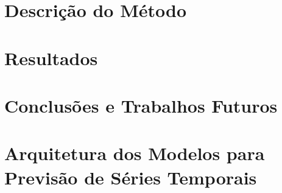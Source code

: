 \documentclass[a4paper,12pt,oneside,openany]{book}
\begin{document}
\chapter{Descrição do Método}
\label{cap5}


\chapter{Resultados}
\label{resultados}


\chapter{Conclusões e Trabalhos Futuros}
\label{conclusoes}


\normalsize
\cleardoublepage
{}



\appendix
\chapter{Arquitetura dos Modelos para Previsão de Séries Temporais}
\label{ApendiceA}



\backmatter
\end{document}
